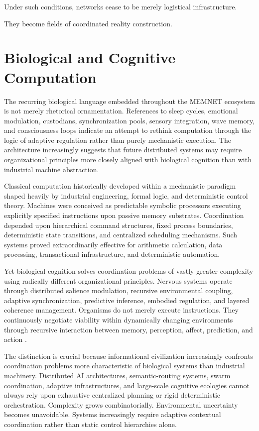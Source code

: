 \documentclass[11pt,a4paper]{article}
\begin{document}
Under such conditions, networks cease to be merely logistical infrastructure.

They become fields of coordinated reality construction.

\section{Biological and Cognitive Computation}

The recurring biological language embedded throughout the MEMNET ecosystem is not merely rhetorical ornamentation. References to sleep cycles, emotional modulation, custodians, synchronization pools, sensory integration, wave memory, and consciousness loops indicate an attempt to rethink computation through the logic of adaptive regulation rather than purely mechanistic execution. The architecture increasingly suggests that future distributed systems may require organizational principles more closely aligned with biological cognition than with industrial machine abstraction.

Classical computation historically developed within a mechanistic paradigm shaped heavily by industrial engineering, formal logic, and deterministic control theory. Machines were conceived as predictable symbolic processors executing explicitly specified instructions upon passive memory substrates. Coordination depended upon hierarchical command structures, fixed process boundaries, deterministic state transitions, and centralized scheduling mechanisms. Such systems proved extraordinarily effective for arithmetic calculation, data processing, transactional infrastructure, and deterministic automation.

Yet biological cognition solves coordination problems of vastly greater complexity using radically different organizational principles. Nervous systems operate through distributed salience modulation, recursive environmental coupling, adaptive synchronization, predictive inference, embodied regulation, and layered coherence management. Organisms do not merely execute instructions. They continuously negotiate viability within dynamically changing environments through recursive interaction between memory, perception, affect, prediction, and action \cite{friston2010}.

The distinction is crucial because informational civilization increasingly confronts coordination problems more characteristic of biological systems than industrial machinery. Distributed AI architectures, semantic-routing systems, swarm coordination, adaptive infrastructures, and large-scale cognitive ecologies cannot always rely upon exhaustive centralized planning or rigid deterministic orchestration. Complexity grows combinatorially. Environmental uncertainty becomes unavoidable. Systems increasingly require adaptive contextual coordination rather than static control hierarchies alone.
\end{document}
